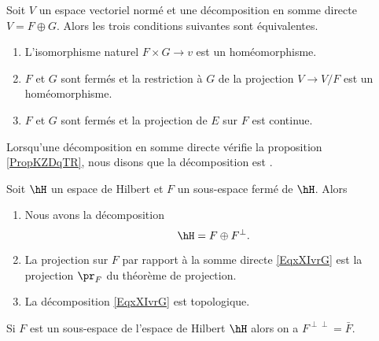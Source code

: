 \begin{proposition}     \label{PropKZDqTR}
    Soit \( V\) un espace vectoriel normé et une décomposition en somme directe \( V=F\oplus G\). Alors les trois conditions suivantes sont équivalentes.
    \begin{enumerate}
        \item
            L'isomorphisme naturel \( F\times G\to v\) est un homéomorphisme.
        \item
            \( F\) et \( G\) sont fermés et la restriction à \( G\) de la projection \( V\to V/F\) est un homéomorphisme.
        \item
            \( F\) et \( G\) sont fermés et la projection de \( E\) sur \( F\) est continue.
    \end{enumerate}
\end{proposition}
Lorsqu'une décomposition en somme directe vérifie la proposition \ref{PropKZDqTR}, nous disons que la décomposition est .

\begin{theorem}     \label{ThowZyaiz}
    Soit \( \hH\) un espace de Hilbert et \( F\) un sous-espace fermé de \( \hH\). Alors
    \begin{enumerate}
        \item
            Nous avons la décomposition
            \begin{equation}        \label{EqxXIvrG}
                \hH=F\oplus F^{\perp}.
            \end{equation}
        \item       \label{ItemThowZyaizii}
            La projection sur \( F\) par rapport à la somme directe \eqref{EqxXIvrG} est la projection \( \pr_F\) du théorème de projection.
        \item
            La décomposition \eqref{EqxXIvrG} est topologique.
    \end{enumerate}
\end{theorem}

\begin{proposition}
    Si \( F\) est un sous-espace de l'espace de Hilbert \( \hH\) alors on a \( F^{\perp\perp}=\bar F\).
\end{proposition}

